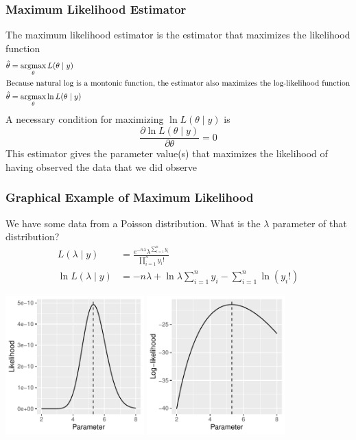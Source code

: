 \documentclass{beamer}
\DeclareMathOperator*{\argmax}{argmax}
\begin{document}
\begin{frame}\frametitle{Maximum Likelihood Estimator}
    The maximum likelihood estimator is the estimator that maximizes the likelihood function
    \begin{align*}
        \hat{\theta} &= \argmax_\theta L(\theta \mid y) \\
        \intertext{Because natural log is a montonic function, the estimator also maximizes the log-likelihood function}
        \hat{\theta} &= \argmax_\theta \ln L(\theta \mid y)
    \end{align*}
    A necessary condition for maximizing $\ln L(\theta \mid y)$ is
    $$\frac{\partial \ln L(\theta \mid y)}{\partial \theta} = 0$$
    This estimator gives the parameter value(s) that maximizes the likelihood of having observed the data that we did observe
\end{frame}

\begin{frame}\frametitle{Graphical Example of Maximum Likelihood}
    We have some data from a Poisson distribution. What is the $\lambda$ parameter of that distribution?
    \begin{align*}
        L(\lambda \mid y) &= \frac{e^{-n \lambda} \lambda^{\sum_{i=1}^n y_i}}{\prod_{i = 1}^n y_i!} \\
        \ln L(\lambda \mid y) &= -n \lambda + \ln \lambda \sum_{i = 1}^n y_i - \sum_{i = 1}^n \ln (y_i!)
    \end{align*}
    \begin{center}
        \includegraphics[width=0.4\textwidth]{likelihood.pdf}
        \hspace{5ex}
        \includegraphics[width=0.4\textwidth]{log_likelihood.pdf}
    \end{center}
\end{frame}
\end{document}

